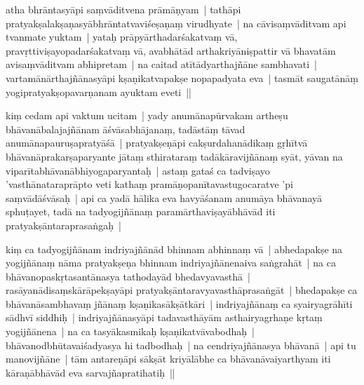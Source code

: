 \documentclass[article,12pt,a4paper]{memoir}%
\newcounter{parCount}
\begin{document}
	  
	  \pstart \leavevmode%
	\label{thakur75-16.7}atha bhrāntasyāpi saṃvāditvena prāmāṇyam | tathāpi pratyakṣalakṣaṇasyābhrāntatvaviśeṣaṇaṃ virudhyate | na cāvisaṃvāditvam api tvanmate yuktam | yataḥ prāpyārthadarśakatvaṃ vā, pravṛttiviṣayopadarśakatvaṃ vā, avabhātād arthakriyāniṣpattir vā bhavatām avisaṃvāditvam abhipretam | na caitad atītādyarthajñāne sambhavati | vartamānārthajñānasyāpi kṣaṇikatvapakṣe nopapadyata eva | tasmāt saugatānāṃ yogipratyakṣopavarṇanam ayuktam eveti || 
	{}
	\pend%
      

	  
	  \pstart \leavevmode%
	\label{thakur75-16.12}kiṃ cedam api vaktum ucitam | yady anumānapūrvakam artheṣu bhāvanābalajajñānam āśvāsabhājanaṃ, tadāstāṃ tāvad anumānapauruṣapratyāśā | pratyakṣeṇāpi cakṣurdahanādikaṃ gṛhītvā bhāvanāprakarṣaparyante jātaṃ sthirataraṃ tadākāravijñānaṃ syāt, yāvan na viparītabhāvanābhiyogaparyantaḥ | astaṃ gataś ca tadviṣayo 'vasthānataraprāpto veti kathaṃ pramāṇopanītavastugocaratve 'pi saṃvādāśvāsaḥ | api ca yadā hālika eva havyāśanam anumāya bhāvanayā sphuṭayet, tadā na tadyogijñānaṃ paramārthaviṣayābhāvād iti pratyakṣāntaraprasaṅgaḥ | 
	{}
	\pend%
      

	  
	  \pstart \leavevmode%
	\label{thakur75-16.19}kiṃ ca tadyogijñānam indriyajñānād bhinnam abhinnaṃ vā | abhedapakṣe na yogijñānaṃ nāma pratyakṣeṇa bhinnam indriyajñānenaiva saṅgrahāt | na ca bhāvanopaskṛtasantānasya tathodayād bhedavyavasthā | rasāyanādisaṃskārāpekṣayāpi pratyakṣāntaravyavasthāprasaṅgāt | bhedapakṣe ca bhāvanāsambhavaṃ jñānaṃ kṣaṇikasākṣātkāri | indriyajñānaṃ ca syairyagrāhīti sādhvī siddhiḥ | indriyajñānasyāpi tadavasthāyām asthairyagrhaṇe kṛtaṃ yogijñānena | na ca tasyākasmikaḥ kṣaṇikatvāvabodhaḥ | bhāvanodbhūtavaiśadyasya hi tadbodhaḥ | na cendriyajñānasya bhāvanā | api tu manovijñāne | tām antareṇāpi sākṣāt kriyālābhe ca bhāvanāvaiyarthyam iti kāraṇābhāvād eva sarvajñapratihatiḥ || 
	{}
	\pend%
      
\end{document}
